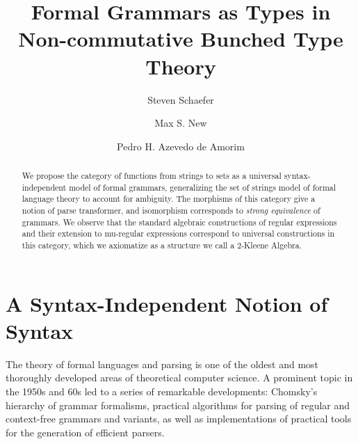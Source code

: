 \documentclass[sigconf,anonymous,review,screen]{acmart}
\begin{document}
\title{Formal Grammars as Types in Non-commutative Bunched Type Theory}
\author{Steven Schaefer}

\author{Max S. New}

\author{Pedro H. Azevedo de Amorim}

\begin{abstract}
  We propose the category of functions from strings to sets as a
  universal syntax-independent model of formal grammars, generalizing
  the set of strings model of formal language theory to account for
  ambiguity. The morphisms of this category give a notion of parse
  transformer, and isomorphism corresponds to \emph{strong
  equivalence} of grammars. We observe that the standard algebraic
  constructions of regular expressions and their extension to
  mu-regular expressions correspond to universal constructions in this
  category, which we axiomatize as a structure we call a 2-Kleene
  Algebra.
\end{abstract}

\maketitle

\section{A Syntax-Independent Notion of Syntax}

The theory of formal languages and parsing is one of the oldest and
most thoroughly developed areas of theoretical computer science. A
prominent topic in the 1950s and 60s led to a series of remarkable
developments: Chomsky's hierarchy of grammar formalisms, practical
algorithms for parsing of regular and context-free grammars and
variants, as well as implementations of practical tools for the
generation of efficient parsers.
\end{document}
